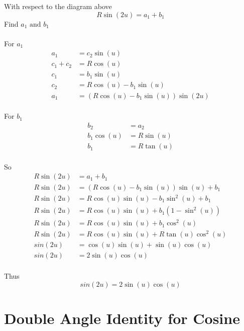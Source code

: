 With respect to the diagram above
\[R\sin{(2u)} = a_1 + b_1\]
Find \(a_1 \text{ and } b_1\)\\
\\
For \(a_1\) \\
\begin{align*}
a_1 &= c_2\sin{(u)} \\
c_1 + c_2 &= R\cos{(u)} \\
c_1 &= b_1\sin{(u)} \\
c_2 &=  R\cos{(u)} - b_1\sin{(u)} \\ 
a_1 &= (R\cos{(u)} - b_1\sin{(u)})\sin{(2u)}
\end{align*}
\\
For \(b_1\) \\
\begin{align*}
b_2 &= a_2 \\
b_1\cos{(u)} &= R\sin{(u)} \\
b_1 &= R\tan{(u)}
\end{align*}
\\
So
\begin{align*}
R\sin{(2u)} &= a_1 + b_1 \\
R\sin{(2u)} &= (R\cos{(u)} - b_1\sin{(u)})\sin{(u)} + b_1 \\
R\sin{(2u)} &= R\cos{(u)}\sin{(u)} -b_1\sin^2{(u)} +b_1 \\
R\sin{(2u)} &= R\cos{(u)}\sin{(u)} + b_1(1 -\sin^2{(u)})\\
R\sin{(2u)} &= R\cos{(u)}\sin{(u)} + b_1\cos^2{(u)} \\
R\sin{(2u)} &= R\cos{(u)}\sin{(u)} + R\tan{(u)}\cos^2{(u)} \\
sin{(2u)} &= \cos{(u)}\sin{(u)} + \sin{(u)}\cos{(u)} \\
sin{(2u)} &= 2\sin{(u)}\cos{(u)} 
\end{align*}
\\
Thus
\[sin{(2u)} = 2\sin{(u)}\cos{(u)} \]

\section{Double Angle Identity for Cosine}